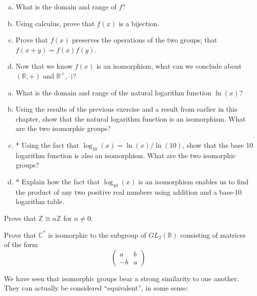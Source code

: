 \begin{exercise}\label{exercise:isomorph:e_isomorph_proof}
\begin{enumerate}[(a)]
\item
What is the domain and range of $f$?
\item
Using calculus, prove that $f(x)$ is a bijection.
\item
Prove that $f(x)$ preserves the operations of the two groups; that $f(x + y) = f(x)f(y)$.
\item
Now that we know $f(x)$ is an isomorphism, what can we conclude about $({\mathbb R},+)$ and ${\mathbb R}^+,\cdot)$?
\end{enumerate}
\end{exercise}

\begin{exercise}
\begin{enumerate}[(a)]
\item
What is the domain and range of the natural logarithm function $\ln(x)$?
\item
Using the results of the previous exercise and a result from earlier in this chapter, show that the natural logarithm function is an isomorphism. What are the two isomorphic groups?
\item
* Using the fact that $\log_{10}(x) = \ln(x) / \ln(10)$, show that the base 10 logarithm function is also an isomorphism.  What are the two isomorphic groups?
\item 
* Explain how the fact that $\log_{10}(x)$ is an isomorphism enables us to find the product of any two positive real numbers using addition and a base-10 logarithm table. 
\end{enumerate}
\end{exercise}

\begin{exercise}\label{exercise:isomorph:iso_prac1}
Prove that ${\mathbb Z} \cong n{\mathbb Z}$ for $n \neq 0$.
\end{exercise}
 
\begin{exercise}\label{exercise:isomorph:iso_prac2}
Prove that ${\mathbb C}^\ast$ is isomorphic to the subgroup of $GL_2(
{\mathbb R} )$ consisting of matrices of the form 
\[
\begin{pmatrix}
a & b \\
-b & a
\end{pmatrix}
\]
\end{exercise}

We have seen that isomorphic groups bear a strong similarity to one another. They can actually be considered ``equivalent'', in some sense:

